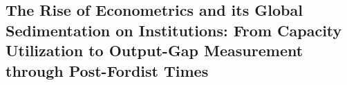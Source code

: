 \documentclass[11pt,a4paper]{article}
\begin{document}
\subsection{The Rise of Econometrics and its Global Sedimentation on Institutions: From Capacity Utilization to Output-Gap Measurement through Post-Fordist Times}
\label{subsec:22_postfordist_capacity_utilization}

%
%
%


\end{document}
